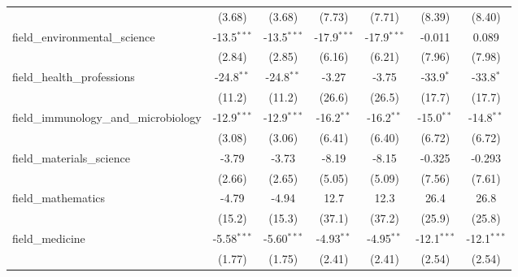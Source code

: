 \begin{tabular}{lcccccc}
                                                               & (3.68)         & (3.68)         & (7.73)        & (7.71)        & (8.39)        & (8.40)\\   
   field\_environmental\_science                               & -13.5$^{***}$  & -13.5$^{***}$  & -17.9$^{***}$ & -17.9$^{***}$ & -0.011        & 0.089\\   
                                                               & (2.84)         & (2.85)         & (6.16)        & (6.21)        & (7.96)        & (7.98)\\   
   field\_health\_professions                                  & -24.8$^{**}$   & -24.8$^{**}$   & -3.27         & -3.75         & -33.9$^{*}$   & -33.8$^{*}$\\   
                                                               & (11.2)         & (11.2)         & (26.6)        & (26.5)        & (17.7)        & (17.7)\\   
   field\_immunology\_and\_microbiology                        & -12.9$^{***}$  & -12.9$^{***}$  & -16.2$^{**}$  & -16.2$^{**}$  & -15.0$^{**}$  & -14.8$^{**}$\\   
                                                               & (3.08)         & (3.06)         & (6.41)        & (6.40)        & (6.72)        & (6.72)\\   
   field\_materials\_science                                   & -3.79          & -3.73          & -8.19         & -8.15         & -0.325        & -0.293\\   
                                                               & (2.66)         & (2.65)         & (5.05)        & (5.09)        & (7.56)        & (7.61)\\   
   field\_mathematics                                          & -4.79          & -4.94          & 12.7          & 12.3          & 26.4          & 26.8\\   
                                                               & (15.2)         & (15.3)         & (37.1)        & (37.2)        & (25.9)        & (25.8)\\   
   field\_medicine                                             & -5.58$^{***}$  & -5.60$^{***}$  & -4.93$^{**}$  & -4.95$^{**}$  & -12.1$^{***}$ & -12.1$^{***}$\\   
                                                               & (1.77)         & (1.75)         & (2.41)        & (2.41)        & (2.54)        & (2.54)\\   

\end{tabular}
